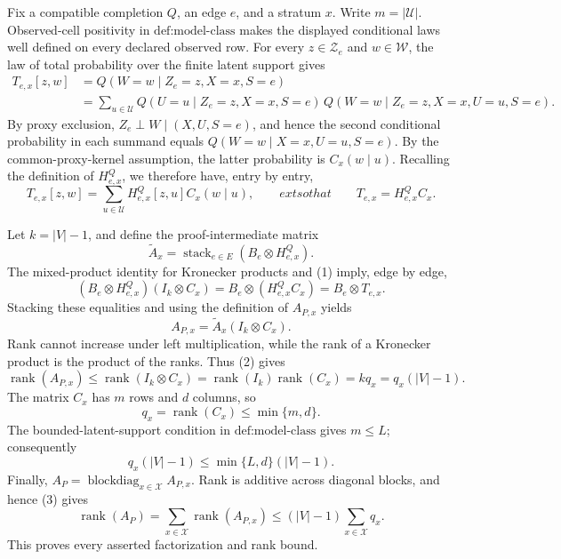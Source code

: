 Fix a compatible completion \(Q\), an edge \(e\), and a stratum \(x\).  Write \(m=|\mathcal U|\).  Observed-cell positivity in \(\text{def:model-class}\) makes the displayed conditional laws well defined on every declared observed row.  For every \(z\in\mathcal Z_e\) and \(w\in\mathcal W\), the law of total probability over the finite latent support gives
\[
\begin{aligned}
T_{e,x}[z,w]
&=Q(W=w\mid Z_e=z,X=x,S=e)\\
&=\sum_{u\in\mathcal U}Q(U=u\mid Z_e=z,X=x,S=e)\,
 Q(W=w\mid Z_e=z,X=x,U=u,S=e).
\end{aligned}
\]
By proxy exclusion, \(Z_e\perp W\mid(X,U,S=e)\), and hence the second conditional probability in each summand equals \(Q(W=w\mid X=x,U=u,S=e)\).  By the common-proxy-kernel assumption, the latter probability is \(C_x(w\mid u)\).  Recalling the definition of \(H^Q_{e,x}\), we therefore have, entry by entry,
\[
T_{e,x}[z,w]=\sum_{u\in\mathcal U}H^Q_{e,x}[z,u]C_x(w\mid u),
\qquad	ext{so that}\qquad
T_{e,x}=H^Q_{e,x}C_x.
\tag{1}
\]

Let \(k=|V|-1\), and define the proof-intermediate matrix
\[
\widetilde A_x=\operatorname{stack}_{e\in E}(B_e\otimes H^Q_{e,x}).
\]
The mixed-product identity for Kronecker products and (1) imply, edge by edge,
\[
(B_e\otimes H^Q_{e,x})(I_k\otimes C_x)
=B_e\otimes(H^Q_{e,x}C_x)
=B_e\otimes T_{e,x}.
\]
Stacking these equalities and using the definition of \(A_{P,x}\) yields
\[
A_{P,x}=\widetilde A_x(I_k\otimes C_x).
\tag{2}
\]
Rank cannot increase under left multiplication, while the rank of a Kronecker product is the product of the ranks.  Thus (2) gives
\[
\operatorname{rank}(A_{P,x})
\leq \operatorname{rank}(I_k\otimes C_x)
=\operatorname{rank}(I_k)\operatorname{rank}(C_x)
=kq_x=q_x(|V|-1).
\tag{3}
\]
The matrix \(C_x\) has \(m\) rows and \(d\) columns, so
\[
q_x=\operatorname{rank}(C_x)\leq\min\{m,d\}.
\]
The bounded-latent-support condition in \(\text{def:model-class}\) gives \(m\leq L\); consequently
\[
q_x(|V|-1)\leq\min\{L,d\}(|V|-1).
\tag{4}
\]
Finally, \(A_P=\operatorname{blockdiag}_{x\in\mathcal X}A_{P,x}\).  Rank is additive across diagonal blocks, and hence (3) gives
\[
\operatorname{rank}(A_P)
=\sum_{x\in\mathcal X}\operatorname{rank}(A_{P,x})
\leq (|V|-1)\sum_{x\in\mathcal X}q_x.
\]
This proves every asserted factorization and rank bound.

